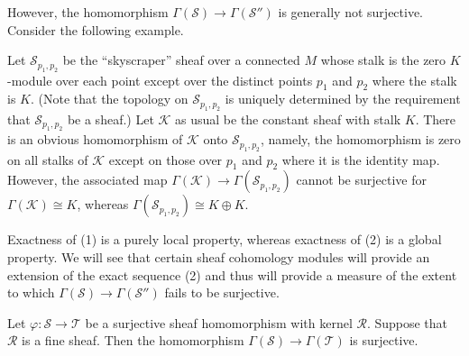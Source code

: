 However, the homomorphism $\Gamma(\mathcal{S}) \to \Gamma(\mathcal{S}'')$ is generally not surjective. Consider the following example.

Let  $ \mathcal{S}_{p_1, p_2} $ be the “skyscraper” sheaf over a connected  $ M $ whose stalk is the zero  $ K $-module over each point except over the distinct points  $ p_1 $ and  $ p_2 $ where the stalk is  $ K $. (Note that the topology on  $ \mathcal{S}_{p_1, p_2} $ is uniquely determined by the requirement that  $ \mathcal{S}_{p_1, p_2} $ be a sheaf.) Let  $ \mathcal{K} $ as usual be the constant sheaf with stalk  $ K $. There is an obvious homomorphism of  $ \mathcal{K} $ onto  $ \mathcal{S}_{p_1, p_2} $, namely, the homomorphism is zero on all stalks of  $ \mathcal{K} $ except on those over  $ p_1 $ and  $ p_2 $ where it is the identity map. However, the associated map  $ \Gamma(\mathcal{K}) \to \Gamma(\mathcal{S}_{p_1, p_2}) $ cannot be surjective for  $ \Gamma(\mathcal{K}) \cong K $, whereas  $ \Gamma(\mathcal{S}_{p_1, p_2}) \cong K \oplus K $. 

Exactness of (1) is a purely local property, whereas exactness of (2) is a global property. We will see that certain sheaf cohomology modules will provide an extension of the exact sequence (2) and thus will provide a measure of the extent to which $\Gamma(\mathcal{S}) \to \Gamma(\mathcal{S}'')$ fails to be surjective.

\begin{theorem}\label{thm:5.12}
Let $\varphi\colon\mathcal{S}\to\mathcal{T}$ be a surjective sheaf homomorphism with kernel $\mathcal{R}$. Suppose that $\mathcal{R}$ is a fine sheaf. Then the homomorphism $\Gamma(\mathcal{S})\to\Gamma(\mathcal{T})$ is surjective.

\end{theorem}

